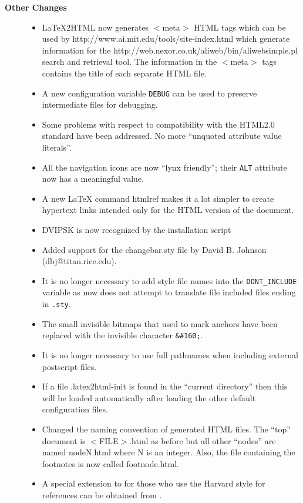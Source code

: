\begin{description}
\item[{\bf Other Changes}] \hfill
\begin{itemize}
\item LaTeX2HTML now generates $<$meta$>$ HTML tags which can be used
by 
{http://www.ai.mit.edu/tools/site-index.html}
 which generate information for the 
{http://web.nexor.co.uk/aliweb/bin/aliwebsimple.pl} 
search and retrieval tool. The information in the $<$meta$>$ tags
contains
the title of each separate HTML file. 
\item A new configuration variable {\tt DEBUG} can be used to preserve
intermediate files for debugging. 
\item Some problems with respect to compatibility with the HTML2.0 
standard have been addressed. No more ``unquoted attribute value literals''.
\item All the navigation icons are now ``lynx friendly''; their
{\tt ALT} attribute now has a meaningful value.
\item A new LaTeX command {\fn htmlref} makes it a lot simpler
to create hypertext links intended only for the HTML version of
the document.
\item {\fn DVIPSK} is now recognized by the installation script
\item Added support for the {\fn changebar.sty} file by 
David B. Johnson (dbj@titan.rice.edu).
\item It is no longer necessary to add style file names into the 
{\tt DONT\_INCLUDE} variable as \latextohtml now does not
attempt to translate file included files ending in {\tt .sty}.
\item The small invisible bitmaps that used to mark anchors have been
replaced with the invisible character \verb|&#160;|.
\item It is no longer necessary to use full pathnames when
including external postscript files.
\item If a file {\fn .latex2html-init} is found in the ``current
directory'' then this will be loaded automatically after loading the
other default configuration files.
\item Changed the naming convention of generated HTML files. The
``top'' document is {\fn $<$FILE$>$.html} as before but all other ``nodes''
are named {\fn nodeN.html} where {\fn N} is an integer. Also, the file
containing
the footnotes is now called {\fn footnode.html}.
\item A special extension to \latextohtml for those who use the 
Harvard style for references can be obtained from
.
\end{itemize}
\end{description}


